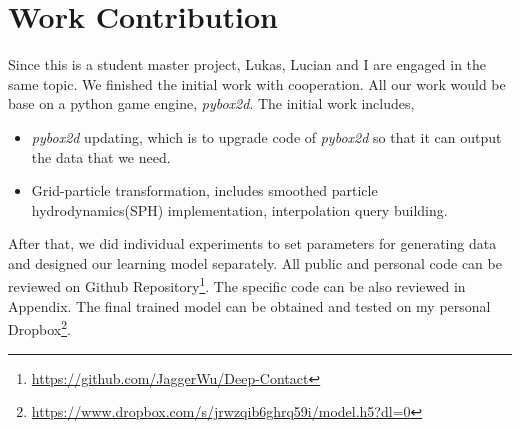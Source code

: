 \section{Work Contribution}
    Since this is a student master project, Lukas, Lucian and I are engaged in the same topic. We finished the initial work with cooperation. All our work would be base on a python game engine, \textit{pybox2d}. The initial work includes,

    \begin{itemize}
        \item \textit{pybox2d} updating, which is to upgrade code of \textit{pybox2d} so that it can output the data that we need.
        \item Grid-particle transformation, includes smoothed particle hydrodynamics(SPH) implementation, interpolation query building.
    \end{itemize}
    After that, we did individual experiments to set parameters for generating data and designed our learning model separately. All public and personal code can be reviewed on Github Repository\footnote{\url{https://github.com/JaggerWu/Deep-Contact}}. The specific code can be also reviewed in Appendix. The final trained model can be obtained and tested on my personal Dropbox\footnote{\url{https://www.dropbox.com/s/jrwzqib6ghrq59i/model.h5?dl=0}}.